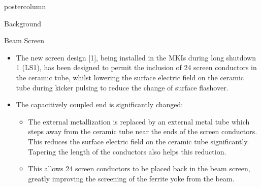 \documentclass[final,hyperref={pdfpagelabels=false}]{beamer}
\begin{document}
\begin{frame}
\begin{columns}
\begin{column}{.49\textwidth}
\begin{beamercolorbox}[center,wd=\textwidth]{postercolumn}
\begin{minipage}[T]{.95\textwidth}
{\begin{block}{Background}
	\end{block}
 \vfill
	\begin{block}{Beam Screen}
\begin{figure}
\end{figure}

\begin{itemize}
\item{The new screen design [1], being installed  in the MKIs during long shutdown 1 (LS1), has been designed to permit the inclusion of 24 screen conductors in the ceramic tube, whilst lowering the surface electric field on the ceramic tube during kicker pulsing to reduce the change of surface flashover.}
\item{The capacitively coupled end is significantly changed:}
\begin{itemize}
\item{The external metallization is replaced by an external metal tube which steps away from the ceramic tube near the ends of the screen conductors. This reduces the surface electric field on the ceramic tube significantly. Tapering the length of the conductors also helps this reduction.}
\item{This allows 24 screen conductors to be placed back in the beam screen, greatly improving the screening of the ferrite yoke from the beam.}
\end{itemize}
\end{itemize}


\end{block}}
\end{minipage}
\end{beamercolorbox}
\end{column}
\end{columns}
\end{frame}
\end{document}
